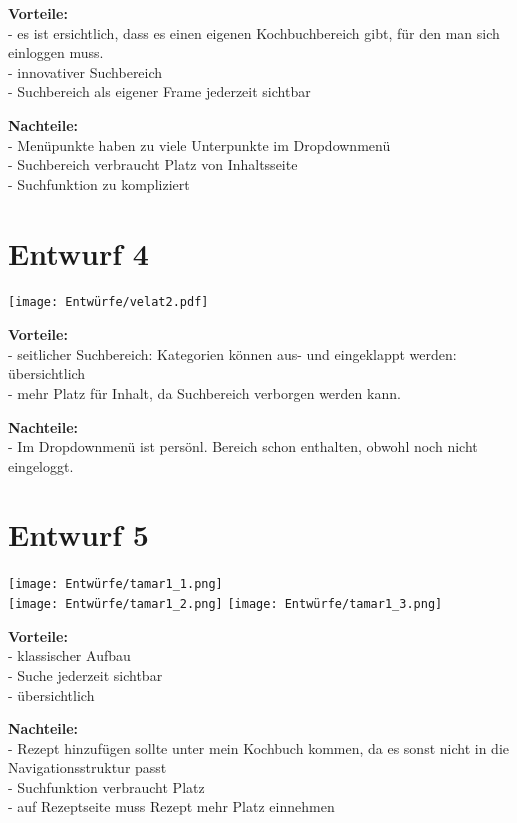 \documentclass[parskip,10pt,abstracton]{scrartcl}
\begin{document}
\textbf{Vorteile:}\\
- es ist ersichtlich, dass es einen eigenen Kochbuchbereich gibt, für den man sich einloggen muss.\\
- innovativer Suchbereich\\
- Suchbereich als eigener Frame jederzeit sichtbar


\textbf{Nachteile:}\\
- Menüpunkte haben zu viele Unterpunkte im Dropdownmenü\\
- Suchbereich verbraucht Platz von Inhaltsseite\\
- Suchfunktion zu kompliziert

\section*{Entwurf 4} %

\texttt{[image: Entwürfe/velat2.pdf]}


\textbf{Vorteile:}\\
- seitlicher Suchbereich: Kategorien können aus- und eingeklappt werden: übersichtlich\\
- mehr Platz für Inhalt, da Suchbereich verborgen werden kann.

\textbf{Nachteile:}\\
- Im Dropdownmenü ist persönl. Bereich schon enthalten, obwohl noch nicht eingeloggt.

\newpage
\section*{Entwurf 5} %

\texttt{[image: Entwürfe/tamar1\_1.png]}\\
\texttt{[image: Entwürfe/tamar1\_2.png]}
\texttt{[image: Entwürfe/tamar1\_3.png]}



\textbf{Vorteile:}\\
- klassischer Aufbau\\
- Suche jederzeit sichtbar\\
- übersichtlich

\textbf{Nachteile:}\\
- Rezept hinzufügen sollte unter mein Kochbuch kommen, da es sonst nicht in die Navigationsstruktur passt\\
- Suchfunktion verbraucht Platz\\
- auf Rezeptseite muss Rezept mehr Platz einnehmen
\newpage
\end{document}
